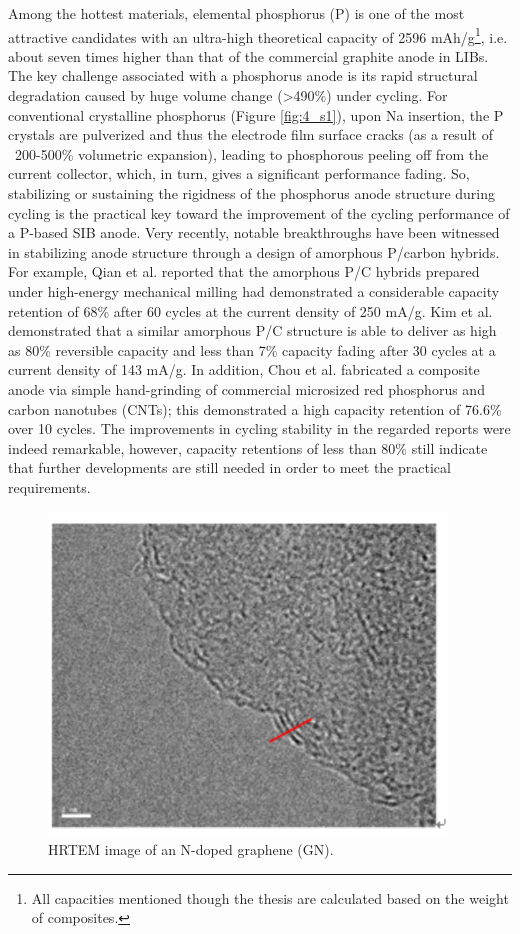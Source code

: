 Among the hottest materials, elemental phosphorus (P) is one of the most attractive candidates with an ultra-high theoretical capacity of 2596 mAh/g\footnote{All capacities mentioned though the thesis are calculated based on the weight of composites.},\cite{Qian2013b,Kim2013c,Li2013c} i.e. about seven times higher than that of the commercial graphite anode in LIBs. The key challenge associated with a phosphorus anode is its rapid structural degradation caused by huge volume change (>490\%) under cycling. For conventional crystalline phosphorus (Figure \ref{fig:4_s1}), upon Na insertion, the P crystals are pulverized and thus the electrode film surface cracks (as a result of ~200-500\% volumetric expansion), leading to phosphorous peeling off from the current collector, which, in turn, gives a significant performance fading. So, stabilizing or sustaining the rigidness of the phosphorus anode structure during cycling is the practical key toward the improvement of the cycling performance of a P-based SIB anode. Very recently, notable breakthroughs have been witnessed in stabilizing anode structure through a design of amorphous P/carbon hybrids.\cite{Qian2013b,Kim2013c,Li2013c} For example, Qian et al. reported that the amorphous P/C hybrids prepared under high-energy mechanical milling had demonstrated a considerable capacity retention of 68\% after 60 cycles at the current density of 250 mA/g.\cite{Qian2013b} Kim et al. demonstrated that a similar amorphous P/C structure is able to deliver as high as 80\% reversible capacity and less than 7\% capacity fading after 30 cycles at a current density of 143 mA/g.\cite{Kim2013c} In addition, Chou et al. fabricated a composite anode via simple hand-grinding of commercial microsized red phosphorus and carbon nanotubes (CNTs); this demonstrated a high capacity retention of 76.6\% over 10 cycles.\cite{Li2013c} The improvements in cycling stability in the regarded reports were indeed remarkable, however, capacity retentions of less than 80\% still indicate that further developments are still needed in order to meet the practical requirements.\cite{Luo2015b}\\

\begin{figure}  
\centering
\includegraphics[width=300pt]{figures/figure4_s2}
\caption[TEM of GN]
{HRTEM image of an N-doped graphene (GN).
\label{fig:4_s2}}
\end{figure}

